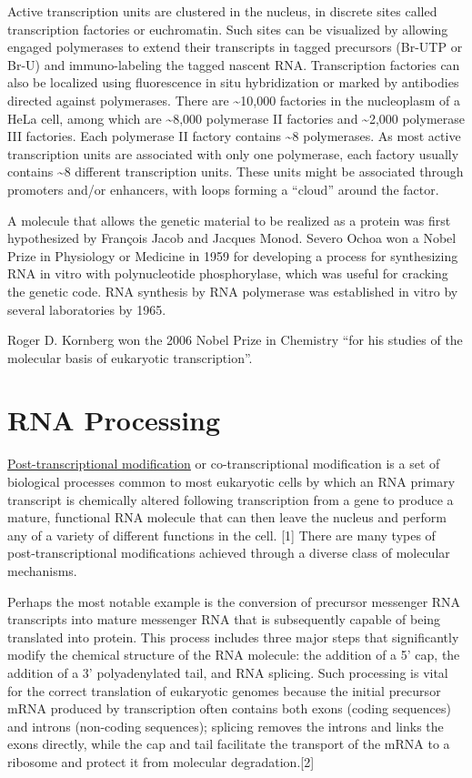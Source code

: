 Active transcription units are clustered in the nucleus, in discrete sites called transcription factories or euchromatin. Such sites can be visualized by allowing engaged polymerases to extend their transcripts in tagged precursors (Br-UTP or Br-U) and immuno-labeling the tagged nascent RNA. Transcription factories can also be localized using fluorescence in situ hybridization or marked by antibodies directed against polymerases. There are \textasciitilde{}10,000 factories in the nucleoplasm of a HeLa cell, among which are \textasciitilde{}8,000 polymerase II factories and \textasciitilde{}2,000 polymerase III factories. Each polymerase II factory contains \textasciitilde{}8 polymerases. As most active transcription units are associated with only one polymerase, each factory usually contains \textasciitilde{}8 different transcription units. These units might be associated through promoters and/or enhancers, with loops forming a ``cloud'' around the factor.

A molecule that allows the genetic material to be realized as a protein was first hypothesized by François Jacob and Jacques Monod. Severo Ochoa won a Nobel Prize in Physiology or Medicine in 1959 for developing a process for synthesizing RNA in vitro with polynucleotide phosphorylase, which was useful for cracking the genetic code. RNA synthesis by RNA polymerase was established in vitro by several laboratories by 1965.

Roger D. Kornberg won the 2006 Nobel Prize in Chemistry ``for his studies of the molecular basis of eukaryotic transcription''.

\hypertarget{rna-processing}{%
\section{RNA Processing}\label{rna-processing}}

\href{https://en.wikipedia.org/wiki/Post-transcriptional_modification}{Post-transcriptional modification} or co-transcriptional modification is a set of biological processes common to most eukaryotic cells by which an RNA primary transcript is chemically altered following transcription from a gene to produce a mature, functional RNA molecule that can then leave the nucleus and perform any of a variety of different functions in the cell. {[}1{]} There are many types of post-transcriptional modifications achieved through a diverse class of molecular mechanisms.

Perhaps the most notable example is the conversion of precursor messenger RNA transcripts into mature messenger RNA that is subsequently capable of being translated into protein. This process includes three major steps that significantly modify the chemical structure of the RNA molecule: the addition of a 5' cap, the addition of a 3' polyadenylated tail, and RNA splicing. Such processing is vital for the correct translation of eukaryotic genomes because the initial precursor mRNA produced by transcription often contains both exons (coding sequences) and introns (non-coding sequences); splicing removes the introns and links the exons directly, while the cap and tail facilitate the transport of the mRNA to a ribosome and protect it from molecular degradation.{[}2{]}

